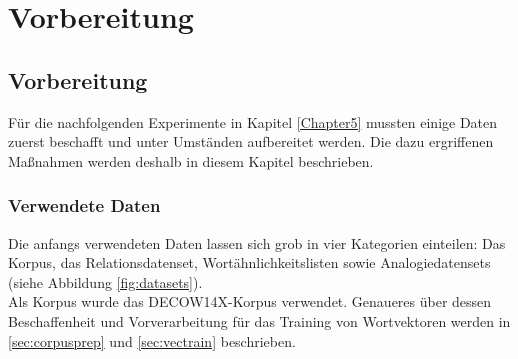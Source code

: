 
\chapter{Vorbereitung} %

\label{Chapter4} %


\section{Vorbereitung}

  Für die nachfolgenden Experimente in Kapitel \ref{Chapter5}
  mussten einige Daten zuerst beschafft und unter Umständen aufbereitet werden. Die  dazu ergriffenen Maßnahmen werden
  deshalb in diesem Kapitel beschrieben.

  \subsection{Verwendete Daten}

  Die anfangs verwendeten Daten lassen sich grob in vier Kategorien einteilen: Das Korpus, das Relationsdatenset,
  Wortähnlichkeitslisten sowie Analogiedatensets (siehe Abbildung \ref{fig:datasets}).\\
  Als Korpus wurde das \textsc{DECOW14X}-Korpus verwendet. Genaueres über dessen Beschaffenheit und Vorverarbeitung für das
  Training von Wortvektoren werden in \ref{sec:corpusprep} und \ref{sec:vectrain} beschrieben.

